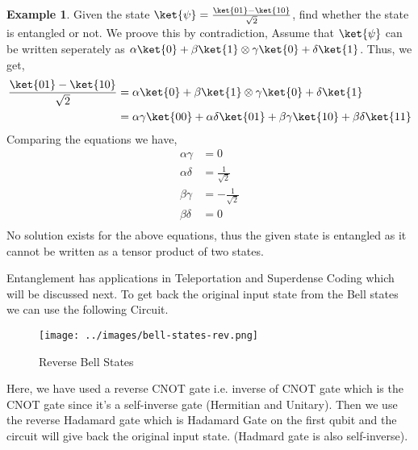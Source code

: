 \documentclass[12pt, oneside]{book}
\theoremstyle{definition}
\theoremstyle{definition}
\newtheorem{example}{Example}[section]
\theoremstyle{remark}
\begin{document}
\begin{example}
    Given the state $\ket{\psi}=\frac{\ket{01}-\ket{10}}{\sqrt{2}}$, find whether the state is entangled or not.
    We proove this by contradiction, Assume that $\ket{\psi}$ can be written seperately as $\alpha\ket{0}+\beta\ket{1} \otimes \gamma\ket{0}+\delta\ket{1}$.
    Thus, we get, 
    \begin{align*}
        \frac{\ket{01}-\ket{10}}{\sqrt{2}}&=\alpha\ket{0}+\beta\ket{1} \otimes \gamma\ket{0}+\delta\ket{1}\\
        &=\alpha\gamma\ket{00}+\alpha\delta\ket{01}+\beta\gamma\ket{10}+\beta\delta\ket{11}\\
    \end{align*}
    Comparing the equations we have, 
    \begin{align*}
        \alpha\gamma&=0 \\
        \alpha\delta&=\frac{1}{\sqrt{2}} \\
        \beta\gamma&=-\frac{1}{\sqrt{2}} \\
        \beta\delta&=0 \\
    \end{align*}
    No solution exists for the above equations, thus the given state is entangled as it cannot be written as a tensor product of two states.
\end{example}
Entanglement has applications in Teleportation and Superdense Coding which will be discussed next.
To get back the original input state from the Bell states we can use the following Circuit.
\begin{figure}[H]
    \centering
    \texttt{[image: ../images/bell-states-rev.png]}
    \caption{Reverse Bell States}
    \label{fig:bell-states-rev}
\end{figure}
Here, we have used a reverse CNOT gate i.e. inverse of CNOT gate which is the CNOT gate since it's a self-inverse gate (Hermitian and Unitary).
Then we use the reverse Hadamard gate which is Hadamard Gate on the first qubit and the circuit will give back the original input state. (Hadmard gate is also self-inverse).
\end{document}
